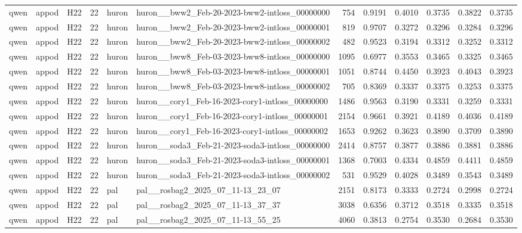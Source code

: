 \begin{table}[tbp]
\begin{tabular}{lllrllrrrrrr}
qwen & appod & H22 & 22 & huron & huron\_\_bww2\_Feb-20-2023-bww2-intloss\_00000000 & 754 & 0.9191 & 0.4010 & 0.3735 & 0.3822 & 0.3735 \\
qwen & appod & H22 & 22 & huron & huron\_\_bww2\_Feb-20-2023-bww2-intloss\_00000001 & 819 & 0.9707 & 0.3272 & 0.3296 & 0.3284 & 0.3296 \\
qwen & appod & H22 & 22 & huron & huron\_\_bww2\_Feb-20-2023-bww2-intloss\_00000002 & 482 & 0.9523 & 0.3194 & 0.3312 & 0.3252 & 0.3312 \\
qwen & appod & H22 & 22 & huron & huron\_\_bww8\_Feb-03-2023-bww8-intloss\_00000000 & 1095 & 0.6977 & 0.3553 & 0.3465 & 0.3325 & 0.3465 \\
qwen & appod & H22 & 22 & huron & huron\_\_bww8\_Feb-03-2023-bww8-intloss\_00000001 & 1051 & 0.8744 & 0.4450 & 0.3923 & 0.4043 & 0.3923 \\
qwen & appod & H22 & 22 & huron & huron\_\_bww8\_Feb-03-2023-bww8-intloss\_00000002 & 705 & 0.8369 & 0.3337 & 0.3375 & 0.3253 & 0.3375 \\
qwen & appod & H22 & 22 & huron & huron\_\_cory1\_Feb-16-2023-cory1-intloss\_00000000 & 1486 & 0.9563 & 0.3190 & 0.3331 & 0.3259 & 0.3331 \\
qwen & appod & H22 & 22 & huron & huron\_\_cory1\_Feb-16-2023-cory1-intloss\_00000001 & 2154 & 0.9661 & 0.3921 & 0.4189 & 0.4036 & 0.4189 \\
qwen & appod & H22 & 22 & huron & huron\_\_cory1\_Feb-16-2023-cory1-intloss\_00000002 & 1653 & 0.9262 & 0.3623 & 0.3890 & 0.3709 & 0.3890 \\
qwen & appod & H22 & 22 & huron & huron\_\_soda3\_Feb-21-2023-soda3-intloss\_00000000 & 2414 & 0.8757 & 0.3877 & 0.3886 & 0.3881 & 0.3886 \\
qwen & appod & H22 & 22 & huron & huron\_\_soda3\_Feb-21-2023-soda3-intloss\_00000001 & 1368 & 0.7003 & 0.4334 & 0.4859 & 0.4411 & 0.4859 \\
qwen & appod & H22 & 22 & huron & huron\_\_soda3\_Feb-21-2023-soda3-intloss\_00000002 & 531 & 0.9529 & 0.4028 & 0.3489 & 0.3543 & 0.3489 \\
qwen & appod & H22 & 22 & pal & pal\_\_rosbag2\_2025\_07\_11-13\_23\_07 & 2151 & 0.8173 & 0.3333 & 0.2724 & 0.2998 & 0.2724 \\
qwen & appod & H22 & 22 & pal & pal\_\_rosbag2\_2025\_07\_11-13\_37\_37 & 3038 & 0.6356 & 0.3712 & 0.3518 & 0.3335 & 0.3518 \\
qwen & appod & H22 & 22 & pal & pal\_\_rosbag2\_2025\_07\_11-13\_55\_25 & 4060 & 0.3813 & 0.2754 & 0.3530 & 0.2684 & 0.3530 \\

\end{tabular}
\end{table}
